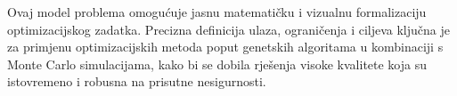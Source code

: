 Ovaj model problema omogućuje jasnu matematičku i vizualnu formalizaciju optimizacijskog zadatka. Precizna definicija ulaza, ograničenja i ciljeva ključna je za primjenu optimizacijskih metoda poput genetskih algoritama u kombinaciji s Monte Carlo simulacijama, kako bi se dobila rješenja visoke kvalitete koja su istovremeno i robusna na prisutne nesigurnosti.
